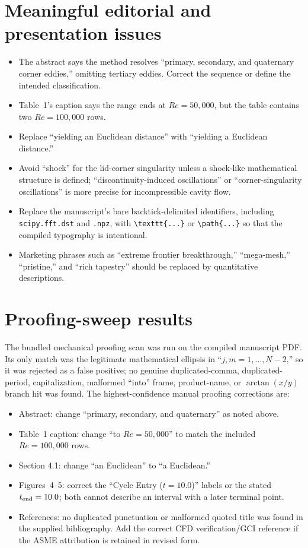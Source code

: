 \documentclass[11pt]{article}
\begin{document}
\section*{Meaningful editorial and presentation issues}

\begin{itemize}
  \item The abstract says the method resolves ``primary, secondary, and quaternary corner eddies,'' omitting tertiary eddies.  Correct the sequence or define the intended classification.
  \item Table~1's caption says the range ends at $Re=50{,}000$, but the table contains two $Re=100{,}000$ rows.
  \item Replace ``yielding an Euclidean distance'' with ``yielding a Euclidean distance.''
  \item Avoid ``shock'' for the lid-corner singularity unless a shock-like mathematical structure is defined; ``discontinuity-induced oscillations'' or ``corner-singularity oscillations'' is more precise for incompressible cavity flow.
  \item Replace the manuscript's bare backtick-delimited identifiers, including \texttt{scipy.fft.dst} and \texttt{.npz}, with \verb|\texttt{...}| or \verb|\path{...}| so that the compiled typography is intentional.
  \item Marketing phrases such as ``extreme frontier breakthrough,'' ``mega-mesh,'' ``pristine,'' and ``rich tapestry'' should be replaced by quantitative descriptions.
\end{itemize}

\section*{Proofing-sweep results}

The bundled mechanical proofing scan was run on the compiled manuscript PDF.  Its only match was the legitimate mathematical ellipsis in ``$j,m=1,\ldots,N-2$,'' so it was rejected as a false positive; no genuine duplicated-comma, duplicated-period, capitalization, malformed ``into'' frame, product-name, or $\arctan(x/y)$ branch hit was found.  The highest-confidence manual proofing corrections are:

\begin{itemize}
  \item Abstract: change ``primary, secondary, and quaternary'' as noted above.
  \item Table~1 caption: change ``to $Re=50{,}000$'' to match the included $Re=100{,}000$ rows.
  \item Section 4.1: change ``an Euclidean'' to ``a Euclidean.''
  \item Figures~4--5: correct the ``Cycle Entry ($t=10.0$)'' labels or the stated $t_{\rm end}=10.0$; both cannot describe an interval with a later terminal point.
  \item References: no duplicated punctuation or malformed quoted title was found in the supplied bibliography.  Add the correct CFD verification/GCI reference if the ASME attribution is retained in revised form.
\end{itemize}
\end{document}
